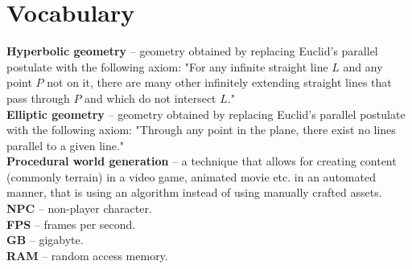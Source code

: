 \section{Vocabulary}
\textbf{Hyperbolic geometry} -- geometry obtained by replacing Euclid's parallel postulate with the following axiom: "For any infinite straight line $L$ and any point $P$ not on it, there are many other infinitely extending straight lines that pass through $P$ and which do not intersect $L$."\cite{Hyperbolic-Wolfram} \\
\textbf{Elliptic geometry} -- geometry obtained by replacing Euclid's parallel postulate with the following axiom: "Through any point in the plane, there exist no lines parallel to a given line."\cite{Elliptic-Wolfram} \\
\textbf{Procedural world generation} -- a technique that allows for creating content (commonly terrain) in a video game, animated movie etc. in an automated manner, that is using an algorithm instead of using manually crafted assets.\\
\textbf{NPC} -- non-player character.\\
\textbf{FPS} -- frames per second.\\
\textbf{GB} -- gigabyte.\\
\textbf{RAM} -- random access memory.\\